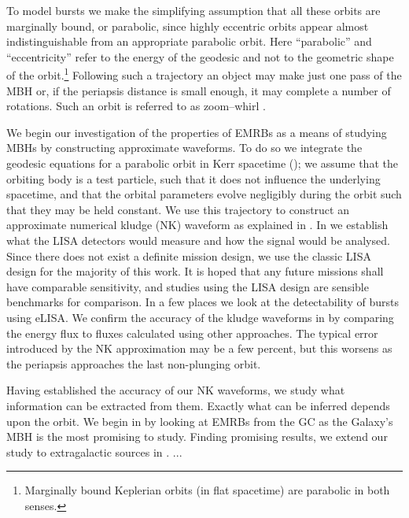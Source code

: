 To model bursts we make the simplifying assumption that all these orbits are marginally bound, or parabolic, since highly eccentric orbits appear almost indistinguishable from an appropriate parabolic orbit. Here ``parabolic'' and ``eccentricity'' refer to the energy of the geodesic and not to the geometric shape of the orbit.\footnote{Marginally bound Keplerian orbits (in flat spacetime) are parabolic in both senses.} Following such a trajectory an object may make just one pass of the MBH or, if the periapsis distance is small enough, it may complete a number of rotations. Such an orbit is referred to as zoom--whirl \citep{Glampedakis2002a}.

We begin our investigation of the properties of EMRBs as a means of studying MBHs by constructing approximate waveforms. To do so we integrate the geodesic equations for a parabolic orbit in Kerr spacetime (); we assume that the orbiting body is a test particle, such that it does not influence the underlying spacetime, and that the orbital parameters evolve negligibly during the orbit such that they may be held constant. We use this trajectory to construct an approximate numerical kludge (NK) waveform \citep{Babak2007} as explained in . In  we establish what the LISA detectors would measure and how the signal would be analysed. Since there does not exist a definite mission design, we use the classic LISA design for the majority of this work. It is hoped that any future missions shall have comparable sensitivity, and studies using the LISA design are sensible benchmarks for comparison. In a few places we look at the detectability of bursts using eLISA. We confirm the accuracy of the kludge waveforms in  by comparing the energy flux to fluxes calculated using other approaches. The typical error introduced by the NK approximation may be a few percent, but this worsens as the periapsis approaches the last non-plunging orbit.

Having established the accuracy of our NK waveforms, we study what information can be extracted from them. Exactly what can be inferred depends upon the orbit. We begin in  by looking at EMRBs from the GC as the Galaxy's MBH is the most promising to study. Finding promising results, we extend our study to extragalactic sources in . ...


